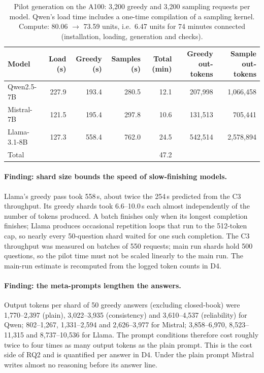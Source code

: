 \documentclass[11pt,a4paper]{report}
\begin{document}
\begin{table}[h]
\centering
\begin{tabular}{lrrrrrr}
\hline
Model & Load (s) & Greedy (s) & Samples (s) & Total (min) &
Greedy out-tokens & Sample out-tokens \\
\hline
Qwen2.5-7B    & 227.9 & 193.4 & 280.5 & 12.1 &   207{,}998 & 1{,}066{,}458 \\
Mistral-7B    & 121.5 & 195.4 & 297.8 & 10.6 &   131{,}513 &   705{,}441 \\
Llama-3.1-8B  & 127.3 & 558.4 & 762.0 & 24.5 &   542{,}514 & 2{,}578{,}894 \\
\hline
Total         &       &       &       & 47.2 & & \\
\hline
\end{tabular}
\caption{Pilot generation on the A100: 3{,}200 greedy and 3{,}200 sampling
requests per model. Qwen's load time includes a one-time compilation of a
sampling kernel. Compute: 80.06 $\rightarrow$ 73.59 units, i.e.\ 6.47 units
for 74 minutes connected (installation, loading, generation and checks).}
\end{table}

\paragraph{Finding: shard size bounds the speed of slow-finishing models.}
Llama's greedy pass took 558\,s, about twice the 254\,s predicted from the C3
throughput. Its greedy shards took 6.6--10.0\,s each almost independently of
the number of tokens produced. A batch finishes only when its longest
completion finishes; Llama produces occasional repetition loops that run to
the 512-token cap, so nearly every 50-question shard waited for one such
completion. The C3 throughput was measured on batches of 550 requests; main
run shards hold 500 questions, so the pilot time must not be scaled linearly
to the main run. The main-run estimate is recomputed from the logged token
counts in D4.

\paragraph{Finding: the meta-prompts lengthen the answers.}
Output tokens per shard of 50 greedy answers (excluding closed-book) were
1{,}770--2{,}397 (plain), 3{,}022--3{,}935 (consistency) and
3{,}610--4{,}537 (reliability) for Qwen; 802--1{,}267, 1{,}331--2{,}594 and
2{,}626--3{,}977 for Mistral; 3{,}858--6{,}970, 8{,}523--11{,}315 and
8{,}737--10{,}536 for Llama. The prompt conditions therefore cost roughly
twice to four times as many output tokens as the plain prompt. This is the
cost side of RQ2 and is quantified per answer in D4. Under the plain prompt
Mistral writes almost no reasoning before its answer line.
\end{document}
